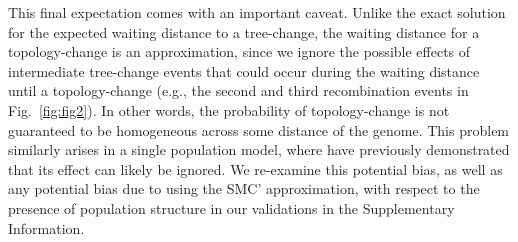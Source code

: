 \documentclass[11pt]{article}
\begin{document}
This final expectation comes with an important caveat. 
Unlike the exact solution for the expected waiting distance to a 
tree-change, the waiting distance for a topology-change is an
approximation, since we ignore the possible effects of intermediate 
tree-change events that could occur during the waiting distance until 
a topology-change 
(e.g., the second and third recombination events in Fig.~\ref{fig:fig2}).
In other words, the probability of topology-change is not guaranteed to
be homogeneous across some distance of the genome.
This problem similarly arises in a single population model,
where \citet{deng_distribution_2021} have previously
demonstrated that its effect can likely be ignored. We 
re-examine this potential bias, 
as well as any potential bias due to using the SMC' approximation,
with respect to the presence
of population structure in our validations in the Supplementary Information.


\end{document}
